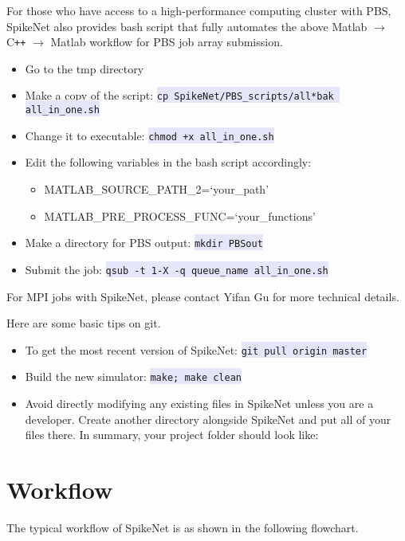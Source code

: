 \documentclass{article}
\newcommand{\mylstinline}[1] {\colorbox{Lavender}{\lstinline[basicstyle=\ttfamily\footnotesize\color{Black}]|#1|} }
\begin{document}
For those who have access to a high-performance computing cluster with PBS, SpikeNet also provides bash script that fully automates the above Matlab $\rightarrow$  C\texttt{++}  $\rightarrow$ Matlab workflow for PBS job array submission. 
\begin{itemize}
\item Go to the tmp directory
\item Make a copy of the script: \mylstinline{cp SpikeNet/PBS_scripts/all*bak all_in_one.sh}
\item Change it to executable: \mylstinline{chmod +x all_in_one.sh}
\item Edit the following variables in the bash script accordingly: 
\begin{itemize}
\item {\footnotesize MATLAB\_SOURCE\_PATH\_2=`your\_path'}
\item {\footnotesize MATLAB\_PRE\_PROCESS\_FUNC=`your\_functions'}
\end{itemize}
\item Make a directory for PBS output: \mylstinline{mkdir PBSout}
\item Submit the job: \mylstinline{qsub -t 1-X -q queue_name all_in_one.sh}
\end{itemize}
For MPI jobs with SpikeNet, please contact Yifan Gu for more technical details.

Here are some basic tips on git.
\begin{itemize}
\item To get the most recent version of SpikeNet: \mylstinline{git pull origin master}
\item Build the new simulator: \mylstinline{make; make clean}
\item Avoid directly modifying any existing files in SpikeNet unless you are a developer. Create another directory alongside SpikeNet and put all of your files there. In summary, your project folder should look like:
\end{itemize}
\hfill\begin{minipage}{\dimexpr\textwidth-1cm}
\xdef\tpd{\the\prevdepth}
\end{minipage}

\section{Workflow}
The typical workflow of SpikeNet is as shown in the following flowchart.
\vskip 0.5cm
\end{document}
